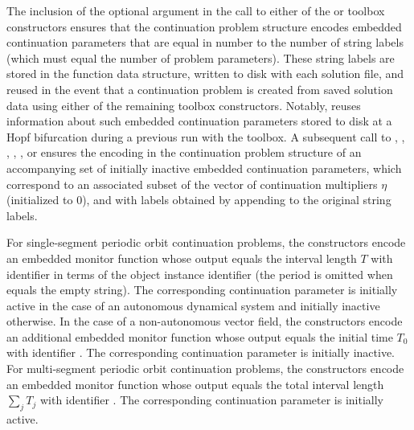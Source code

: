 The inclusion of the  optional argument in the call to either of the  or  toolbox constructors ensures that the continuation problem structure encodes embedded continuation parameters that are equal in number to the number of string labels (which must equal the number of problem parameters). These string labels are stored in the function data structure, written to disk with each solution file, and reused in the event that a continuation problem is created from saved solution data using either of the remaining toolbox constructors. Notably,  reuses information about such embedded continuation parameters stored to disk at a Hopf bifurcation during a previous run with the  toolbox. A subsequent call to , , , , , or  ensures the encoding in the continuation problem structure of an accompanying set of initially inactive embedded continuation parameters, which correspond to an associated subset of the vector of continuation multipliers $\eta$ (initialized to $0$), and with labels obtained by appending  to the original string labels.

For single-segment periodic orbit continuation problems, the  constructors encode an embedded monitor function whose output equals the interval length $T$ with identifier  in terms of the  object instance identifier  (the period is omitted when  equals the empty string). The corresponding continuation parameter is initially active in the case of an autonomous dynamical system and initially inactive otherwise. In the case of a non-autonomous vector field, the  constructors encode an additional embedded monitor function whose output equals the initial time $T_0$ with identifier . The corresponding continuation parameter is initially inactive. For multi-segment periodic orbit continuation problems, the  constructors encode an embedded monitor function whose output equals the total interval length $\sum_j T_j$ with identifier . The corresponding continuation parameter is initially active.

